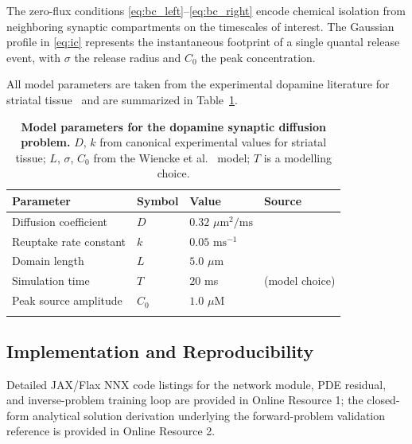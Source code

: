 \documentclass[pdflatex,sn-basic,Numbered]{sn-jnl}
\theoremstyle{thmstyleone}
\theoremstyle{thmstyletwo}
\begin{document}
The zero-flux conditions \eqref{eq:bc_left}--\eqref{eq:bc_right}
encode chemical isolation from neighboring synaptic compartments
on the timescales of interest. The Gaussian profile in
\eqref{eq:ic} represents the instantaneous footprint of a single
quantal release event, with $\sigma$ the release radius and
$C_0$ the peak concentration.

All model parameters are taken from the experimental dopamine
literature for striatal tissue~\cite{CraggRice2004, Nicholson1981}
and are summarized in Table~\ref{tab:params}.

\begin{table}[t]
\centering
\caption{\textbf{Model parameters for the dopamine synaptic
diffusion problem.} $D$, $k$ from canonical experimental values
for striatal tissue; $L$, $\sigma$, $C_0$ from the Wiencke et
al.~\cite{Wiencke2020} model; $T$ is a modelling choice.}
\label{tab:params}
\begin{tabular}{llll}
\toprule
\textbf{Parameter} & \textbf{Symbol} & \textbf{Value} & \textbf{Source} \\
\midrule
Diffusion coefficient    & $D$   & $0.32$ $\mu\text{m}^2/\text{ms}$ & \cite{Nicholson1981, CraggRice2004} \\
Reuptake rate constant   & $k$   & $0.05$ $\text{ms}^{-1}$           & \cite{CraggRice2004} \\
Domain length            & $L$   & $5.0$ $\mu\text{m}$               & \cite{Wiencke2020} \\
Simulation time          & $T$   & $20$ ms                            & (model choice) \\
Peak source amplitude    & $C_0$ & $1.0$ $\mu$M                       & \cite{Wiencke2020} \\
\botrule
\end{tabular}
\end{table}

\subsection{Implementation and Reproducibility}
\label{sec:implementation}

Detailed JAX/Flax NNX code listings for the network module, PDE
residual, and inverse-problem training loop are provided in
Online Resource 1; the closed-form analytical solution
derivation underlying the forward-problem validation reference
is provided in Online Resource 2.
\end{document}
